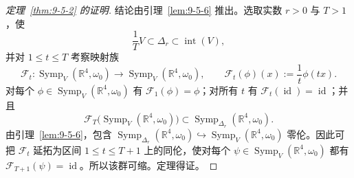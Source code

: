 \begin{proof}[定理~\ref{thm:9-5-2} 的证明]
结论由引理~\ref{lem:9-5-6} 推出。选取实数 $r>0$ 与 $T>1$，使
\[
  \frac1T V\subset\Delta_r\subset\operatorname{int}(V),
\]
并对 $1\le t\le T$ 考察映射族
\[
  \mathcal F_t:\operatorname{Symp}_V(\mathbb R^4,\omega_0)
  \longrightarrow\operatorname{Symp}_V(\mathbb R^4,\omega_0),
  \qquad \mathcal F_t(\phi)(x):=\frac1t\phi(tx).
\]
对每个 $\phi\in\operatorname{Symp}_V(\mathbb R^4,\omega_0)$ 有
$\mathcal F_1(\phi)=\phi$；对所有 $t$ 有
$\mathcal F_t(\operatorname{id})=\operatorname{id}$；并且
\[
  \mathcal F_T\bigl(\operatorname{Symp}_V(\mathbb R^4,\omega_0)\bigr)
  \subset\operatorname{Symp}_{\Delta_r}(\mathbb R^4,\omega_0).
\]
由引理~\ref{lem:9-5-6}，包含
$\operatorname{Symp}_{\Delta_r}(\mathbb R^4,\omega_0)
\hookrightarrow\operatorname{Symp}_V(\mathbb R^4,\omega_0)$ 零伦。因此可把
$\mathcal F_t$ 延拓为区间 $1\le t\le T+1$ 上的同伦，使对每个
$\psi\in\operatorname{Symp}_V(\mathbb R^4,\omega_0)$ 都有
$\mathcal F_{T+1}(\psi)=\operatorname{id}$。所以该群可缩。定理得证。
\end{proof}
